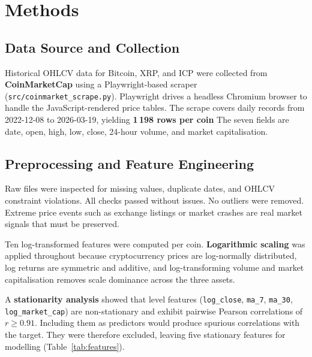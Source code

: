 \section{Methods}

\subsection{Data Source and Collection}

Historical OHLCV data for Bitcoin, XRP, and ICP were collected from \textbf{CoinMarketCap} using a
Playwright-based scraper (\texttt{src/coinmarket\_scrape.py}).
Playwright drives a headless Chromium browser to handle the JavaScript-rendered price tables.
The scrape covers daily records from 2022-12-08 to 2026-03-19, yielding \textbf{1\,198 rows per coin}
The seven fields are date, open, high, low, close, 24-hour volume, and market capitalisation.

\subsection{Preprocessing and Feature Engineering}

Raw files were inspected for missing values, duplicate dates, and OHLCV constraint violations.
All checks passed without issues.
No outliers were removed. Extreme price events such as exchange listings or market crashes are real
market signals that must be preserved.

Ten log-transformed features were computed per coin.
\textbf{Logarithmic scaling} was applied throughout because cryptocurrency prices are log-normally
distributed, log returns are symmetric and additive, and log-transforming volume and market
capitalisation removes scale dominance across the three assets.

A \textbf{stationarity analysis} showed that level features (\texttt{log\_close}, \texttt{ma\_7},
\texttt{ma\_30}, \texttt{log\_market\_cap}) are non-stationary and exhibit pairwise Pearson
correlations of $r \geq 0.91$.
Including them as predictors would produce spurious correlations with the target.
They were therefore excluded, leaving five stationary features for modelling (Table~\ref{tab:features}).

